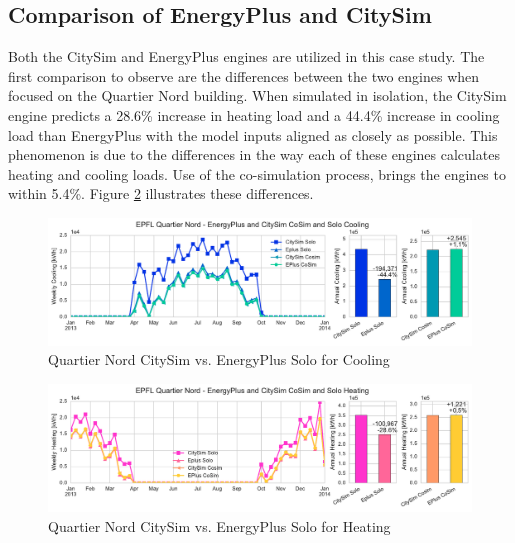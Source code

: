 \documentclass{tBPS2e}
\theoremstyle{plain}
\theoremstyle{definition}
\theoremstyle{remark}
\begin{document}


\subsection{Comparison of EnergyPlus and CitySim}

Both the CitySim and EnergyPlus engines are utilized in this case study. The first comparison to observe are the differences between the two engines when focused on the Quartier Nord building. When simulated in isolation, the CitySim engine predicts a 28.6\% increase in heating load and a 44.4\% increase in cooling load than EnergyPlus with the model inputs aligned as closely as possible. This phenomenon is due to the differences in the way each of these engines calculates heating and cooling loads. Use of the co-simulation process, brings the engines to within 5.4\%. Figure \ref{fig:qn_eplusvscitysim_heating} illustrates these differences.

\begin{figure}[H]
\centering
\includegraphics[scale=0.55]{figures/QN_Cooling}
\caption{Quartier Nord CitySim vs. EnergyPlus Solo for Cooling}
\label{fig:qn_eplusvscitysim_cooling}
\end{figure}

\begin{figure}[H]
\centering
\includegraphics[scale=0.55]{figures/QN_Heating.pdf}
\caption{Quartier Nord CitySim vs. EnergyPlus Solo for Heating}
\label{fig:qn_eplusvscitysim_heating}
\end{figure}
\end{document}
